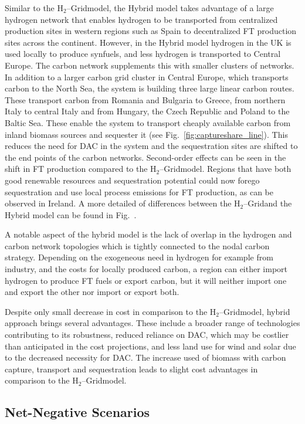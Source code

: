 \documentclass[twocolumn]{article}
\newcommand{\hydrogen}{H$_2$}
\newcommand{\hydrogengrid}{\hydrogen{}--Grid}
\begin{document}
Similar to the \hydrogengrid model, the Hybrid model takes advantage of a large hydrogen network that enables hydrogen to be transported from centralized production sites in western regions such as Spain to decentralized FT production sites across the continent. However, in the Hybrid model hydrogen in the UK is used locally to produce synfuels, and less hydrogen is transported to Central Europe.
The carbon network supplements this with smaller clusters of networks. In addition to a larger carbon grid cluster in Central Europe, which transports carbon to the North Sea, the system is building three large linear carbon routes. These transport carbon from Romania and Bulgaria to Greece, from northern Italy to central Italy and from Hungary, the Czech Republic and Poland to the Baltic Sea. These enable the system to transport cheaply available carbon from inland biomass sources and sequester it (see Fig.~\ref{fig:captureshare_line}). This reduces the need for DAC in the system and the sequestration sites are shifted to the end points of the carbon networks. Second-order effects can be seen in the shift in FT production compared to the \hydrogengrid model. Regions that have both good renewable resources and sequestration potential could now forego sequestration and use local process emissions for FT production, as can be observed in Ireland. A more detailed of differences between the \hydrogengrid and the Hybrid model can be found in Fig.~.


A notable aspect of the hybrid model is the lack of overlap in the hydrogen and carbon network topologies which is tightly connected to the nodal carbon strategy. Depending on the exogeneous need in hydrogen for example from industry, and the costs for locally produced carbon, a region can either import hydrogen to produce FT fuels or export carbon, but it will neither import one and export the other nor import or export both.


Despite only small decrease in cost in comparison to the \hydrogengrid model, hybrid approach brings several advantages. These include a broader range of technologies contributing to its robustness, reduced reliance on DAC, which may be costlier than anticipated in the cost projections, and less land use for wind and solar due to the decreased necessity for DAC. The increase used of biomass with carbon capture, transport and sequestration leads to slight cost advantages in comparison to the \hydrogengrid model.



\subsection*{Net-Negative Scenarios}
\end{document}
